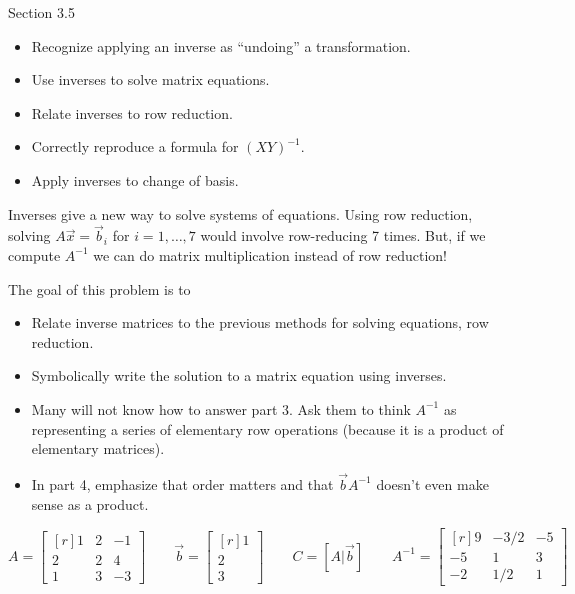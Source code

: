 \documentclass{problemset}
\newcommand{\mat}[1]{\begin{bmatrix*}[r]#1\end{bmatrix*}}
\begin{document}
\begin{lesson}

	Section 3.5

	\begin{itemize}
		\item Recognize applying an inverse as ``undoing'' a transformation.
		\item Use inverses to solve matrix equations.
		\item Relate inverses to row reduction.
		\item Correctly reproduce a formula for $(XY)^{-1}$.
		\item Apply inverses to change of basis.
	\end{itemize}

	Inverses give a new way to solve systems of equations. Using row reduction, solving $A\vec x=\vec b_i$ for $i=1,\ldots, 7$
	would involve row-reducing 7 times. But, if we compute $A^{-1}$ we can do matrix multiplication instead of row reduction!


\end{lesson}
	\question
	\begin{annotation}
		\begin{goals}

			The goal of this problem is to
			\begin{itemize}
				\item Relate inverse matrices to the previous methods for solving
					equations, row reduction.
				\item Symbolically write the solution to a matrix equation using inverses.
			\end{itemize}
		\end{goals}

		\begin{notes}
			\begin{itemize}
				\item Many will not know how to answer part 3. Ask them
					to think $A^{-1}$ as representing a series of elementary row
					operations (because it is a product of elementary matrices).
				\item In part 4, emphasize that order matters and that $\vec bA^{-1}$ doesn't
					even make sense as a product.
			\end{itemize}
		\end{notes}
	\end{annotation}
	\[
		A=\mat{1&2&-1\\2&2&4\\1&3&-3}\qquad
		\vec b=\mat{1\\2\\3}\qquad
		C=[A|\vec b]\qquad
		A^{-1}=\mat{9&-3/2&-5\\-5&1&3\\-2&1/2&1}
	\]
\end{document}
